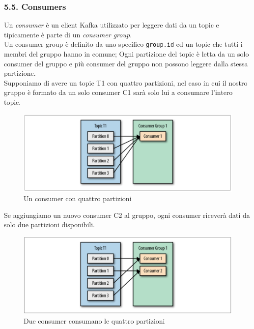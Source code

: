 \documentclass[]{article}
\begin{document}
\newpage

\subsubsection{5.5. Consumers}\label{consumers}

Un \emph{consumer} è un client Kafka utilizzato per leggere dati da un
topic e tipicamente è parte di un \emph{consumer group}.\\
Un consumer group è definito da uno specifico \texttt{group.id} ed un
topic che tutti i membri del gruppo hanno in comune; Ogni partizione del
topic è letta da un solo consumer del gruppo e più consumer del gruppo
non possono leggere dalla stessa partizione.\\
Supponiamo di avere un topic T1 con quattro partizioni, nel caso in cui
il nostro gruppo è formato da un solo consumer C1 sarà solo lui a
consumare l'intero topic.

\begin{figure}
\centering
\includegraphics[width=1.00000\textwidth]{../images/single-consumer.png}
\caption{Un consumer con quattro partizioni \label{figure_3}}
\end{figure}

Se aggiungiamo un nuovo consumer C2 al gruppo, ogni consumer riceverà
dati da solo due partizioni disponibili.

\begin{figure}
\centering
\includegraphics[width=1.00000\textwidth]{../images/two-consumers.png}
\caption{Due consumer consumano le quattro partizioni \label{figure_3}}
\end{figure}
\end{document}
